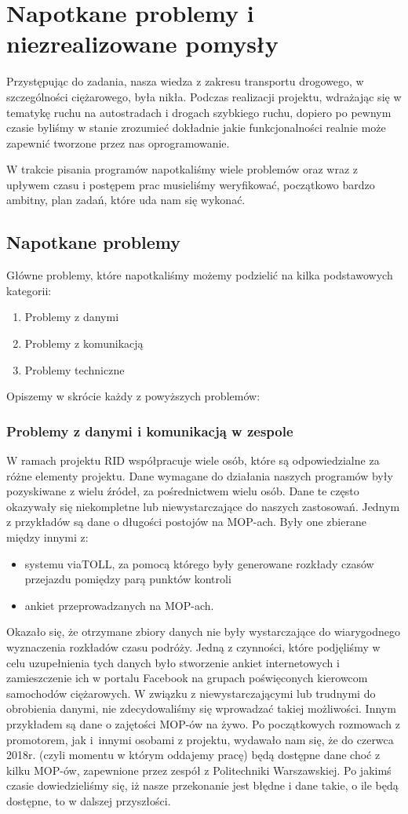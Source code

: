 \chapter{Napotkane problemy i niezrealizowane pomysły}

Przystępując do zadania, nasza wiedza z zakresu transportu drogowego, w szczególności ciężarowego, była nikła. Podczas realizacji projektu, wdrażając się  w tematykę ruchu na autostradach i drogach szybkiego ruchu, dopiero po pewnym czasie byliśmy w stanie zrozumieć dokładnie jakie funkcjonalności realnie może zapewnić tworzone przez nas oprogramowanie.

W trakcie pisania programów napotkaliśmy wiele problemów oraz wraz z upływem czasu i postępem prac musieliśmy weryfikować, początkowo bardzo ambitny, plan zadań, które uda nam się wykonać.

\section{Napotkane problemy}
Główne problemy, które napotkaliśmy możemy podzielić na kilka podstawowych kategorii:
\begin{enumerate}
\item Problemy z danymi
\item Problemy z komunikacją
\item Problemy techniczne
\end{enumerate}
Opiszemy w skrócie każdy z powyższych problemów:
\subsection{Problemy z danymi i komunikacją w zespole}
W ramach projektu RID współpracuje wiele osób, które są odpowiedzialne za różne elementy projektu. 
Dane wymagane do działania naszych programów były pozyskiwane z wielu źródeł, za pośrednictwem wielu osób. Dane te często okazywały się niekompletne lub niewystarczające do naszych zastosowań.
Jednym z przykładów są dane o długości postojów na MOP-ach. Były one zbierane między innymi z:
\begin{itemize}
\item systemu viaTOLL, za pomocą którego były generowane rozkłady czasów przejazdu pomiędzy parą punktów kontroli
\item ankiet przeprowadzanych na MOP-ach. 
\end{itemize}
Okazało się, że otrzymane zbiory danych nie były wystarczające do wiarygodnego wyznaczenia rozkładów czasu podróży. Jedną z czynności, które podjęliśmy w celu uzupełnienia tych danych było stworzenie ankiet internetowych i zamieszczenie ich w portalu Facebook na grupach poświęconych kierowcom samochodów ciężarowych. W związku z niewystarczającymi lub trudnymi do obrobienia danymi, nie zdecydowaliśmy się wprowadzać takiej możliwości.
Innym przykładem są dane o zajętości MOP-ów na żywo. Po początkowych rozmowach z promotorem, jak i~innymi osobami z projektu, wydawało nam się, że do czerwca 2018r. (czyli momentu w którym oddajemy pracę) będą dostępne dane choć z kilku MOP-ów, zapewnione przez zespół z Politechniki Warszawskiej. Po jakimś czasie dowiedzieliśmy się, iż nasze przekonanie jest błędne i dane takie, o ile będą dostępne, to w dalszej przyszłości.
